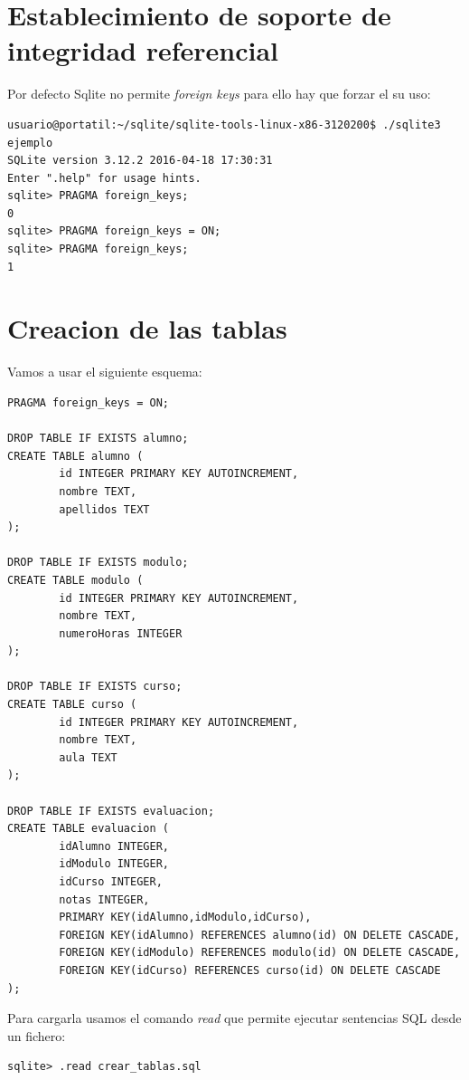 \documentclass[4paper]{article}
\renewcommand{\S}{Sqlite }
\begin{document}
\section{Establecimiento de soporte de integridad referencial}
Por defecto \S no permite \emph{foreign keys} para ello hay que forzar el su uso:
\begin{verbatim}
usuario@portatil:~/sqlite/sqlite-tools-linux-x86-3120200$ ./sqlite3 ejemplo
SQLite version 3.12.2 2016-04-18 17:30:31
Enter ".help" for usage hints.
sqlite> PRAGMA foreign_keys;
0
sqlite> PRAGMA foreign_keys = ON;
sqlite> PRAGMA foreign_keys;
1
\end{verbatim} 

\section{Creacion de las tablas}
Vamos a usar el siguiente esquema:
\begin{verbatim}
PRAGMA foreign_keys = ON;

DROP TABLE IF EXISTS alumno;
CREATE TABLE alumno (
        id INTEGER PRIMARY KEY AUTOINCREMENT,
        nombre TEXT,
        apellidos TEXT
);

DROP TABLE IF EXISTS modulo;
CREATE TABLE modulo (
        id INTEGER PRIMARY KEY AUTOINCREMENT,
        nombre TEXT,
        numeroHoras INTEGER
);

DROP TABLE IF EXISTS curso;
CREATE TABLE curso (
        id INTEGER PRIMARY KEY AUTOINCREMENT,
        nombre TEXT,
        aula TEXT
);

DROP TABLE IF EXISTS evaluacion;
CREATE TABLE evaluacion (
        idAlumno INTEGER,
        idModulo INTEGER,
        idCurso INTEGER,
        notas INTEGER,
        PRIMARY KEY(idAlumno,idModulo,idCurso),
        FOREIGN KEY(idAlumno) REFERENCES alumno(id) ON DELETE CASCADE,
        FOREIGN KEY(idModulo) REFERENCES modulo(id) ON DELETE CASCADE,
        FOREIGN KEY(idCurso) REFERENCES curso(id) ON DELETE CASCADE
);
\end{verbatim}
Para cargarla usamos el comando \emph{read} que permite ejecutar sentencias SQL desde un fichero:
\begin{verbatim}
sqlite> .read crear_tablas.sql
\end{verbatim}
\end{document}
